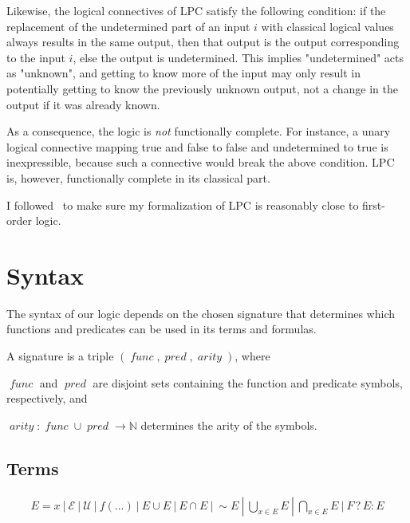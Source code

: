 \documentclass[oneside,12pt]{book}
\theoremstyle{definition}
\theoremstyle{remark}
\newcommand{\ct}{{\sim}} %
\newcommand\var[1]{\mathop{\mathit{#1}}\nolimits}
\newcommand{\conditional}[3]{#1 \mathrel{?} #2 : #3}
\newcommand{\Empty}{\mathcal{E}}
\newcommand{\Universal}{\mathcal{U}}
\newcommand{\func}{\var{func}}
\newcommand{\pred}{\var{pred}}
\newcommand{\arity}{\var{arity}}
\newcommand{\symb}{\var{symbol}}
\begin{document}
Likewise, the logical connectives of LPC satisfy the following condition:
if the replacement of the undetermined part of an input $i$ with classical
logical values always results in the same output, then that output is the output
corresponding to the input $i$, else the output is undetermined.
This implies "undetermined" acts as "unknown", and getting to know more of the input
may only result in potentially getting to know the previously unknown output,
not a change in the output if it was already known.

As a consequence, the logic is \textit{not} functionally complete. For instance,
a unary logical connective mapping true and false to false and undetermined to true
is inexpressible, because such a connective would break the above condition.
LPC is, however, functionally complete in its classical part.

I followed~\cite{firstOrderLogic} to make sure my formalization of LPC is reasonably close
to first-order logic.

\section{Syntax}
The syntax of our logic depends on the chosen signature that determines which
functions and predicates can be used in its terms and formulas.

\begin{defBox}
  A signature is a triple $(\func, \pred, \arity)$, where
  \begin{compactenum}
    \item $\func$ and $\pred$ are disjoint sets containing the function and predicate
      symbols, respectively, and
    \item $\arity\colon \func \cup \pred \to \mathbb{N}$ determines the arity
      of the symbols.
  \end{compactenum}
  
\end{defBox}

\subsection{Terms}
\begin{align*}
  E = x~|~\Empty~|~\Universal~|~f(...)~|~E \cup E~|~E \cap E~|~\ct E%
  ~|~\bigcup_{x \in E}E~|~\bigcap_{x \in E}E~|~\conditional{F}{E}{E}
\end{align*}
\end{document}
